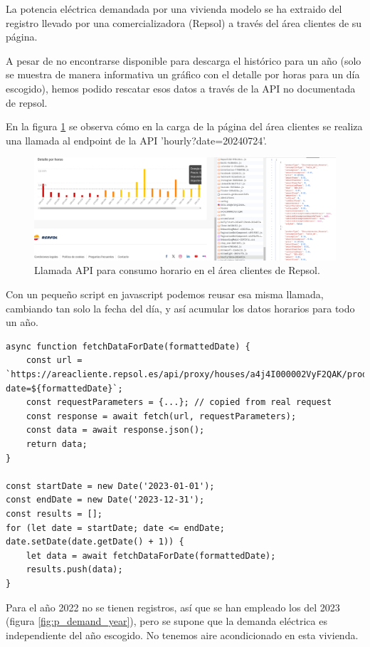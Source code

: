 La potencia eléctrica demandada por una vivienda modelo se ha extraido
del registro llevado por una comercializadora (Repsol) a través del área
clientes de su página.

A pesar de no encontrarse disponible para descarga el histórico para un año
(solo se muestra de manera informativa un gráfico con el detalle por horas para
un día escogido), hemos podido rescatar esos datos a través de la API no
documentada de repsol.

En la figura \ref{fig:repsol_api} se observa cómo en la carga de la página del
área clientes se realiza una llamada al endpoint de la API
'hourly?date=20240724'.

\begin{figure}[h] \centering
	\centering
	\includegraphics[width=1\textwidth]{./capitulos/adquisicion_de_datos/images/repsol_api.png}
	\caption{Llamada API para consumo horario en el área clientes de Repsol.}
	\label{fig:repsol_api}
\end{figure}

Con un pequeño script en javascript podemos reusar esa misma llamada, cambiando
tan solo la fecha del día, y así acumular los datos horarios para todo un año.

\begin{verbatim}
async function fetchDataForDate(formattedDate) {
    const url = `https://areacliente.repsol.es/api/proxy/houses/a4j4I000002VyF2QAK/products/4302580717/consumption/hourly?date=${formattedDate}`;
    const requestParameters = {...}; // copied from real request
    const response = await fetch(url, requestParameters);
    const data = await response.json();
    return data;
}

const startDate = new Date('2023-01-01');
const endDate = new Date('2023-12-31');
const results = [];
for (let date = startDate; date <= endDate; date.setDate(date.getDate() + 1)) {
    let data = await fetchDataForDate(formattedDate);
    results.push(data);
}
\end{verbatim}

Para el año 2022 no se tienen registros, así que se han empleado los del 2023
(figura \ref{fig:p_demand_year}), pero se supone que la demanda eléctrica es
independiente del año escogido. No tenemos aire acondicionado en esta vivienda.

